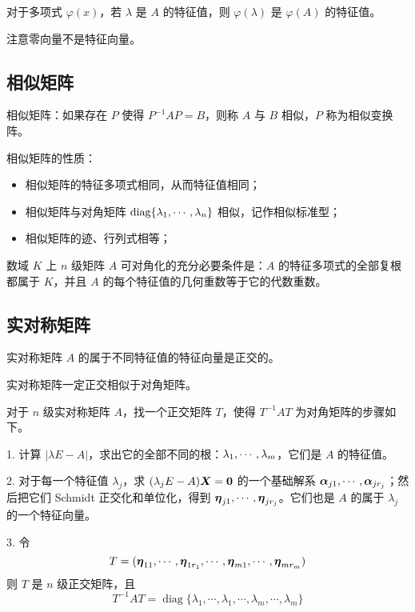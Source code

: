 对于多项式 $\varphi(x)$，若 $\lambda$ 是 $A$ 的特征值，则 $\varphi(\lambda)$ 是 $\varphi(A)$ 的特征值。

注意零向量不是特征向量。



\subsection{相似矩阵}

相似矩阵：如果存在 $P$ 使得 $P^{-1} A P = B$，则称 $A$ 与 $B$ 相似，$P$ 称为相似变换阵。

相似矩阵的性质：
\begin{itemize}
	\item 相似矩阵的特征多项式相同，从而特征值相同；
	\item 相似矩阵与对角矩阵 $\operatorname{diag}\{\lambda_1,\cdots,\lambda_n\}$ 相似，记作相似标准型；
	\item 相似矩阵的迹、行列式相等；
\end{itemize}



\begin{theorem}
	数域 $K$ 上 $n$ 级矩阵 $A$ 可对角化的充分必要条件是：$A$ 的特征多项式的全部复根都属于 $K$，并且 $A$ 的每个特征值的几何重数等于它的代数重数。
\end{theorem}

\subsection{实对称矩阵}

\begin{theorem}
	实对称矩阵 $A$ 的属于不同特征值的特征向量是正交的。
\end{theorem}

\begin{theorem}
	实对称矩阵一定正交相似于对角矩阵。
\end{theorem}

对于 $n$ 级实对称矩阵 $A$，找一个正交矩阵 $T$，使得 $T^{-1}AT$ 为对角矩阵的步骤如下。

1. 计算 $|\lambda E- A|$，求出它的全部不同的根：$\lambda_1,\cdots,\lambda_m$，它们是 $A$ 的特征值。

2. 对于每一个特征值 $\lambda_j$，求 $(\lambda_jE-A)\boldsymbol{X} = \boldsymbol{0}$ 的一个基础解系 $\boldsymbol{\alpha}_{j1},\cdots,\boldsymbol{\alpha}_{jr_j}$；然后把它们 Schmidt 正交化和单位化，得到 $\boldsymbol{\eta}_{j1},\cdots,\boldsymbol{\eta}_{jr_j}$。它们也是 $A$ 的属于 $\lambda_j$ 的一个特征向量。

3. 令
\[ T=(\boldsymbol{\eta}_{11},\cdots,\boldsymbol{\eta}_{1r_1},\cdots,\boldsymbol{\eta}_{m1},\cdots,\boldsymbol{\eta}_{mr_m}) \]
则 $T$ 是 $n$ 级正交矩阵，且
\[ T^{-1}AT = \operatorname{diag}\{\lambda_{1},\cdots,\lambda_{1},\cdots,\lambda_{m},\cdots,\lambda_{m}\} \]

